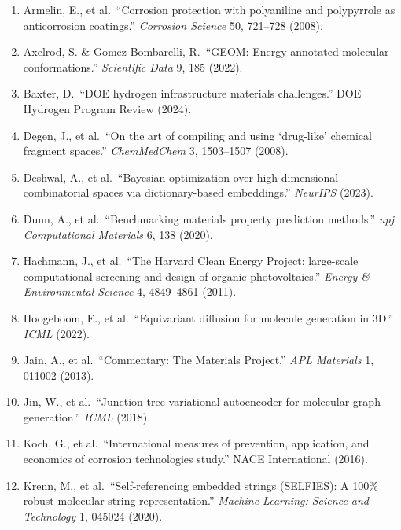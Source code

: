 \documentclass[11pt,letterpaper]{article}
\begin{document}
\begin{enumerate}[noitemsep]

\item Armelin, E., et al.\ ``Corrosion protection with polyaniline and polypyrrole as anticorrosion coatings.'' \textit{Corrosion Science} 50, 721--728 (2008).

\item Axelrod, S. \& Gomez-Bombarelli, R.\ ``GEOM: Energy-annotated molecular conformations.'' \textit{Scientific Data} 9, 185 (2022).

\item Baxter, D.\ ``DOE hydrogen infrastructure materials challenges.'' DOE Hydrogen Program Review (2024).

\item Degen, J., et al.\ ``On the art of compiling and using `drug-like' chemical fragment spaces.'' \textit{ChemMedChem} 3, 1503--1507 (2008).

\item Deshwal, A., et al.\ ``Bayesian optimization over high-dimensional combinatorial spaces via dictionary-based embeddings.'' \textit{NeurIPS} (2023).

\item Dunn, A., et al.\ ``Benchmarking materials property prediction methods.'' \textit{npj Computational Materials} 6, 138 (2020).

\item Hachmann, J., et al.\ ``The Harvard Clean Energy Project: large-scale computational screening and design of organic photovoltaics.'' \textit{Energy \& Environmental Science} 4, 4849--4861 (2011).

\item Hoogeboom, E., et al.\ ``Equivariant diffusion for molecule generation in 3D.'' \textit{ICML} (2022).

\item Jain, A., et al.\ ``Commentary: The Materials Project.'' \textit{APL Materials} 1, 011002 (2013).

\item Jin, W., et al.\ ``Junction tree variational autoencoder for molecular graph generation.'' \textit{ICML} (2018).

\item Koch, G., et al.\ ``International measures of prevention, application, and economics of corrosion technologies study.'' NACE International (2016).

\item Krenn, M., et al.\ ``Self-referencing embedded strings (SELFIES): A 100\% robust molecular string representation.'' \textit{Machine Learning: Science and Technology} 1, 045024 (2020).


\end{enumerate}
\end{document}
